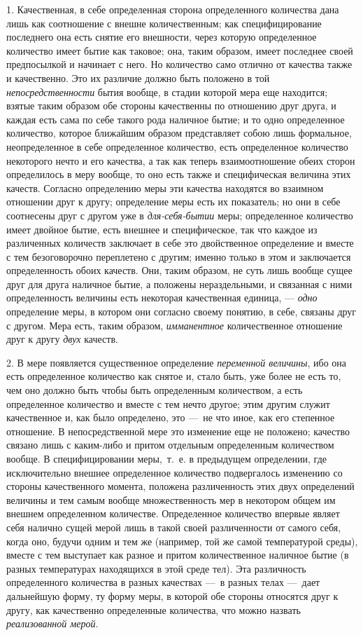 1. Качественная, в себе определенная сторона
определенного количества дана лишь как соотношение с внешне количественным;
как специфицирование последнего она есть снятие его внешности, через
которую определенное количество имеет бытие как таковое; она, таким
образом, имеет последнее своей предпосылкой и начинает с него. Но
количество само отлично от качества также и качественно. Это их различие
должно быть положено в той {\em непосредственности}
бытия вообще, в стадии которой мера еще находится; взятые таким образом обе
стороны качественны по отношению друг друга, и каждая есть сама по себе
такого рода наличное бытие; и то одно определенное количество, которое
ближайшим образом представляет собою лишь формальное, неопределенное в себе
определенное количество, есть определенное количество некоторого нечто и
его качества, а так как теперь взаимоотношение обеих сторон определилось в
меру вообще, то оно есть также и специфическая величина этих качеств.
Согласно определению меры эти качества находятся во взаимном отношении друг
к другу; определение меры есть их показатель; но они в себе соотнесены друг
с другом уже в {\em для-себя-бытии} меры; определенное
количество имеет двойное бытие, есть внешнее и специфическое, так что
каждое из различенных количеств заключает в себе это двойственное
определение и вместе с тем безоговорочно переплетено с другим; именно
только в этом и заключается определенность обоих качеств. Они, таким
образом, не суть лишь вообще сущее друг для друга наличное бытие, а
положены нераздельными, и связанная с ними определенность величины есть
некоторая качественная единица, — {\em одно}
определение меры, в котором они согласно своему понятию, в себе, связаны
друг с другом. Мера есть, таким образом,
{\em имманентное} количественное отношение друг к другу
{\em двух} качеств.

2. В мере появляется существенное определение
{\em переменной величины}, ибо она есть определенное
количество как снятое и, стало быть, уже более не есть то, чем оно должно
быть чтобы быть определенным количеством, а есть определенное количество и
вместе с тем нечто другое; этим другим служит качественное и, как было
определено, это —~не что иное, как его степенное отношение. В
непосредственной мере это изменение еще не положено; качество связано лишь
с каким-либо и притом отдельным определенным количеством вообще. В
специфицировании меры,~т.~е. в предыдущем определении, где исключительно
внешнее определенное количество подвергалось изменению со стороны
качественного момента, положена различенность этих двух определений
величины и тем самым вообще множественность мер в некотором общем им
внешнем определенном количестве. Определенное количество впервые являет
себя налично сущей мерой лишь в такой своей различенности от самого себя,
когда оно, будучи одним и тем же (например, той же самой температурой
среды), вместе с тем выступает как разное и притом количественное наличное
бытие (в разных температурах находящихся в этой среде тел). Эта различность
определенного количества в разных качествах —~в разных телах —~дает
дальнейшую форму, ту форму меры, в которой обе стороны относятся друг к
другу, как качественно определенные количества, что можно назвать
{\em реализованной мерой}.

